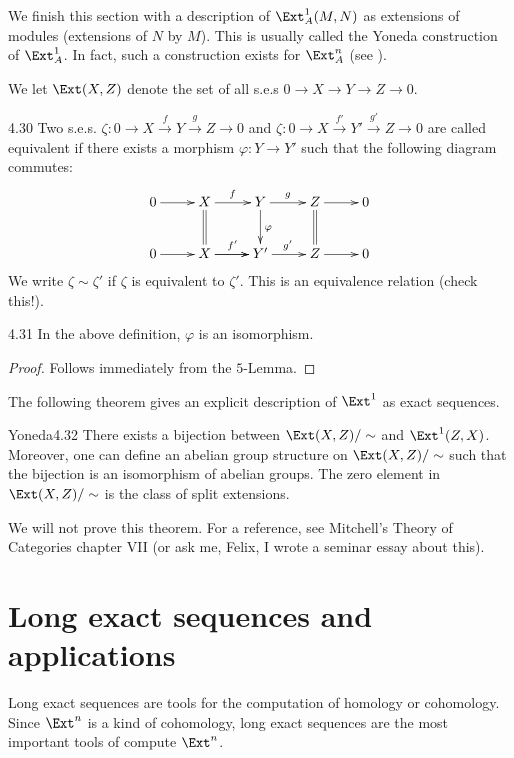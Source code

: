 \documentclass[twoside = false,	%
		headsepline,		%
		parskip = true,
		]{scrbook}						%
\begin{document}
    We finish this section with a description of $\Ext_A^1(M,N)$ as extensions of modules (extensions of $N$ by $M$). This is usually called the Yoneda construction of $\Ext_A^1$. In fact, such a construction exists for $\Ext^n_A$ (see \cite{Weibel.2010}).

    We let $\Ext(X,Z)$ denote the set of all s.e.s $0 \to X \to Y \to Z \to 0$.

    \begin{definition}{}{4.30}
        Two s.e.s. $\zeta: 0 \to X \xrightarrow{f} Y \xrightarrow{g} Z \to 0$ and $\zeta: 0 \to X \xrightarrow{f'} Y' \xrightarrow{g'} Z \to 0$ are called equivalent if there exists a morphism $\varphi: Y \to Y'$ such that the following diagram commutes:
        \begin{equation*}
        \xymatrix {
            0 \ar[r] & X \ar[r]^f \ar@{=}[d] & Y \ar[r]^g \ar[d]^{\varphi} & Z \ar[r] \ar@{=}[d] & 0 \\
            0 \ar[r] & X \ar[r] \ar[r]^{f'} & Y' \ar[r]^{g'} & Z \ar[r] & 0
        }
        \end{equation*}
        We write $\zeta \sim \zeta'$ if $\zeta$ is equivalent to $\zeta'$. This is an equivalence relation (check this!).
    \end{definition}

    \begin{lemma}{}{4.31}
        In the above definition, $\varphi$ is an isomorphism.
    \end{lemma}

    \begin{proof}
        Follows immediately from the $5$-Lemma.
    \end{proof}

    The following theorem gives an explicit description of $\Ext^1$ as exact sequences.

    \begin{theorem}{Yoneda}{4.32}
        There exists a bijection between $\Ext(X,Z)/\sim$ and $\Ext^1(Z,X)$. Moreover, one can define an abelian group structure on $\Ext(X,Z)/\sim$ such that the bijection is an isomorphism of abelian groups. The zero element in $\Ext(X,Z)/\sim$ is the class of split extensions.
    \end{theorem}

    We will not prove this theorem. For a reference, see Mitchell's Theory of Categories \cite{Mitchell.1971} chapter VII (or ask me, Felix, I wrote a seminar essay about this).

\section{Long exact sequences and applications}
    Long exact sequences are tools for the computation of homology or cohomology. Since $\Ext^n$ is a kind of cohomology, long exact sequences are the most important tools of compute $\Ext^n$.
\end{document}
